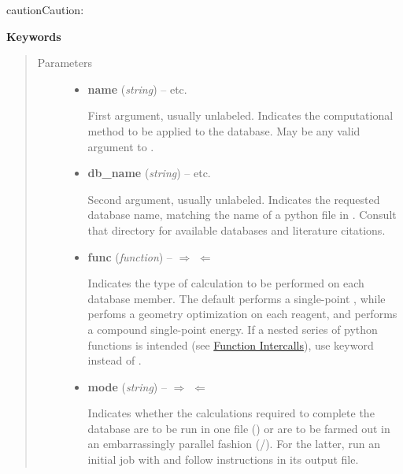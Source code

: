 \documentclass[letterpaper,10pt,english]{sphinxmanual}
\begin{document}
\begin{fulllineitems}
\begin{notice}{caution}{Caution:}
\begin{itemize}
\end{itemize}
\end{notice}

\textbf{Keywords}
\begin{quote}\begin{description}
\item[{Parameters}] \leavevmode\begin{itemize}
\item {} 
\textbf{name} (\emph{string}) -- 
 \textbar{}\textbar{}  \textbar{}\textbar{}  \textbar{}\textbar{} etc.

First argument, usually unlabeled. Indicates the computational method
to be applied to the database. May be any valid argument to
{\hyperref[index:driver.energy]{}}.


\item {} 
\textbf{db\_name} (\emph{string}) -- 
 \textbar{}\textbar{}  \textbar{}\textbar{}  \textbar{}\textbar{} etc.

Second argument, usually unlabeled. Indicates the requested database
name, matching the name of a python file in .
Consult that directory for available databases and literature citations.


\item {} 
\textbf{func} (\emph{function}) -- 
$\Rightarrow$  $\Leftarrow$ \textbar{}\textbar{}  \textbar{}\textbar{} 

Indicates the type of calculation to be performed on each database
member. The default performs a single-point , while
 perfoms a geometry optimization on each reagent, and
 performs a compound single-point energy. If a nested series
of python functions is intended (see {\hyperref[index:function-intercalls]{Function Intercalls}}), use
keyword  instead of .


\item {} 
\textbf{mode} (\emph{string}) -- 
$\Rightarrow$  $\Leftarrow$ \textbar{}\textbar{}  \textbar{}\textbar{} 

Indicates whether the calculations required to complete the
database are to be run in one file () or are to be
farmed out in an embarrassingly parallel fashion
(/).  For the latter, run an initial job with
 and follow instructions in its output file.



\end{itemize}
\end{description}
\end{quote}
\end{fulllineitems}
\end{document}
